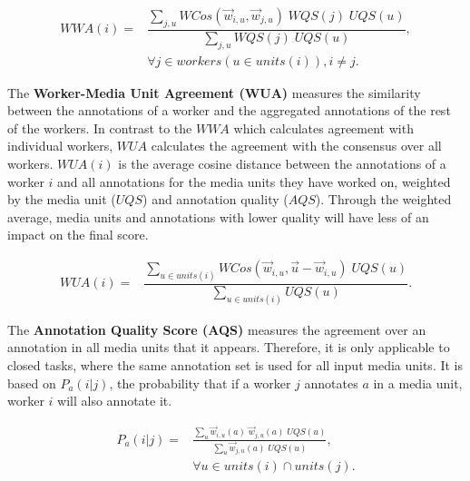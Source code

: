 \begin{align}
 WWA(i) = & \dfrac{ \sum\limits_{j, u} WCos(\vec{w}_{i,u} , \vec{w}_{j,u}) \; WQS(j) \; UQS(u) }{ \sum\limits_{j, u} WQS(j) \; UQS(u) }, \\
& \forall j \in workers(u \in units(i)), i \neq j . \nonumber
\end{align}

The \textbf{Worker-Media Unit Agreement (WUA)} measures the similarity between the annotations of a worker and the aggregated annotations of the rest of the workers. In contrast to the $WWA$ which calculates agreement with individual workers, $WUA$ calculates the agreement with the consensus over all workers. $WUA(i)$ is the average cosine distance between the annotations of a worker $i$ and all annotations for the media units they have worked on, weighted by the media unit ($UQS$) and annotation quality ($AQS$). Through the weighted average, media units and annotations with lower quality will have less of an impact on the final score.

\begin{align}
WUA(i) = & \dfrac{\sum\limits_{u \in units(i)} WCos(\vec{w}_{i,u} , \vec{u} - \vec{w}_{i,u}) \; UQS(u)}{\sum\limits_{u \in units(i)} UQS(u)}.
\end{align}


The \textbf{Annotation Quality Score (AQS)} measures the agreement over an annotation in all media units that it appears. Therefore, it is only applicable to closed tasks, where the same annotation set is used for all input media units. It is based on $P_a(i | j)$, the probability that if a worker $j$ annotates $a$ in a media unit, worker $i$ will also annotate it.

\begin{align}
P_a(i | j) = & \frac{ \sum\limits_{u} \vec{w}_{i,u}(a) \; \vec{w}_{j,u}(a) \; UQS(u)}{ \sum\limits_{u} \vec{w}_{j, u}(a) \;  UQS(u) }, \\
& \forall u \in units(i) \cap units(j). \nonumber
\end{align}

